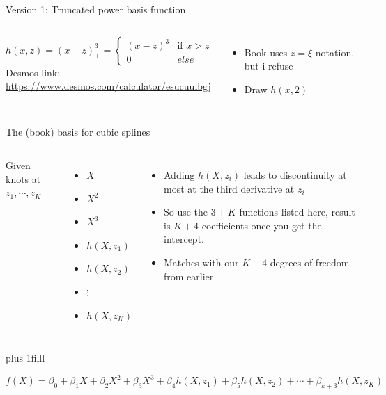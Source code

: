 \documentclass[aspectratio=169,usenames,dvipsnames]{beamer}
\newcommand{\InstructorList}[1]{
\begin{itemize}
	\color{orange}
	#1
\end{itemize}
}
\newcommand{\bvfill}{\vskip0pt plus 1filll}
\begin{document}
\begin{frame}[t]{Version 1: Truncated power basis function}

\begin{columns}
\centering

\begin{equation*}
h(x,z) = (x-z)^3_+ =
\begin{cases}
	(x-z)^3 & \text{if } x>z \\
	0 & else
\end{cases}
\end{equation*}
Desmos link:
\url{https://www.desmos.com/calculator/esucuulbgj}
\centering
\InstructorList{
  \item Book uses $z=\xi$ notation, but i refuse
	\item Draw $h(x,2)$
}

\end{columns}

\end{frame}
\begin{frame}[t]{The (book) basis for cubic splines }

\begin{columns}
\centering
Given knots at $z_1,\cdots,z_K$
\begin{itemize}
	\item $X$
	\item $X^2$
	\item $X^3$
	\item $h(X,z_1)$
	\item $h(X,z_2)$
	\item $\vdots$
	\item $h(X,z_K)$
\end{itemize}
\centering


\InstructorList{
  \item Adding $h(X,z_i)$ leads to discontinuity at most at the third derivative at $z_i$
	\item So use the $3+K$ functions listed here, result is $K+4$ coefficients once you get the intercept.
	\item Matches with our $K+4$ degrees of freedom from earlier
}

\end{columns}

\bvfill

\begin{equation*}
	f(X) = 	
	\beta_0 + 
	\beta_1 X + 
	\beta_2 X^2 + 
	\beta_3 X^3 + 
	\beta_4 h(X,z_1) + 
	\beta_5 h(X,z_2) + 
	\cdots + 
	\beta_{k+3}  h(X,z_K)
\end{equation*}

\end{frame}
\end{document}
